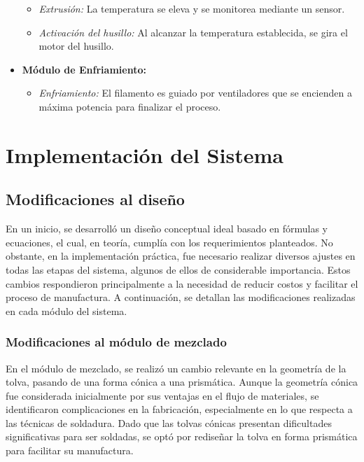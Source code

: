 \documentclass[14pt,oneside]{extarticle} %
\begin{document}
\begin{itemize}
    \begin{itemize}
        \item \textit{Extrusión:} La temperatura se eleva y se monitorea mediante un sensor.
        \item \textit{Activación del husillo:} Al alcanzar la temperatura establecida, se gira el motor del husillo.
    \end{itemize}
    \item \textbf{Módulo de Enfriamiento:}
    \begin{itemize}
        \item \textit{Enfriamiento:} El filamento es guiado por ventiladores que se encienden a máxima potencia para finalizar el proceso.
    \end{itemize}
\end{itemize}

\newpage
\clearpage

\section{Implementación del Sistema}

\subsection{Modificaciones al diseño}
En un inicio, se desarrolló un diseño conceptual ideal basado en fórmulas y ecuaciones, el cual, en teoría, cumplía con los requerimientos planteados. No obstante, en la implementación práctica, fue necesario realizar diversos ajustes en todas las etapas del sistema, algunos de ellos de considerable importancia. Estos cambios respondieron principalmente a la necesidad de reducir costos y facilitar el proceso de manufactura. A continuación, se detallan las modificaciones realizadas en cada módulo del sistema.

\subsubsection{Modificaciones al módulo de mezclado}
En el módulo de mezclado, se realizó un cambio relevante en la geometría de la tolva, pasando de una forma cónica a una prismática. Aunque la geometría cónica fue considerada inicialmente por sus ventajas en el flujo de materiales, se identificaron complicaciones en la fabricación, especialmente en lo que respecta a las técnicas de soldadura. Dado que las tolvas cónicas presentan dificultades significativas para ser soldadas, se optó por rediseñar la tolva en forma prismática para facilitar su manufactura.
\end{document}
